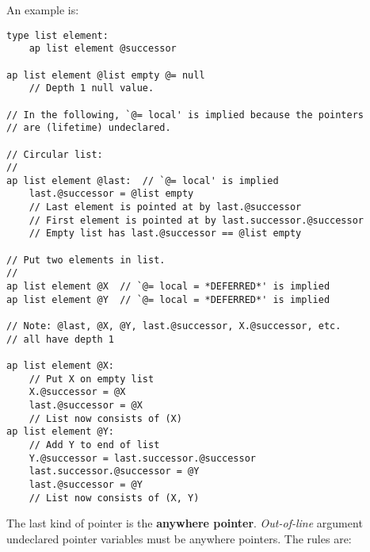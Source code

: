 \documentclass[12pt]{article}
\newcommand{\key}[1]{{\rm \bfseries #1}}
\newenvironment{indpar}[1][0.3in]%
	{\begin{list}{}%
		     {\setlength{\itemsep}{0in}%
		      \setlength{\topsep}{0in}%
		      \setlength{\parsep}{1ex}%
		      \setlength{\labelwidth}{#1}%
		      \setlength{\leftmargin}{#1}%
		      \addtolength{\leftmargin}{\labelsep}}%
	 \item}%
	{\end{list}}
\begin{document}
An example is:
\begin{indpar}\begin{verbatim}
type list element:
    ap list element @successor

ap list element @list empty @= null
    // Depth 1 null value.

// In the following, `@= local' is implied because the pointers
// are (lifetime) undeclared.

// Circular list:
//
ap list element @last:  // `@= local' is implied
    last.@successor = @list empty
    // Last element is pointed at by last.@successor
    // First element is pointed at by last.successor.@successor
    // Empty list has last.@successor == @list empty

// Put two elements in list.
//
ap list element @X  // `@= local = *DEFERRED*' is implied
ap list element @Y  // `@= local = *DEFERRED*' is implied

// Note: @last, @X, @Y, last.@successor, X.@successor, etc.
// all have depth 1

ap list element @X:
    // Put X on empty list
    X.@successor = @X
    last.@successor = @X
    // List now consists of (X)
ap list element @Y:
    // Add Y to end of list
    Y.@successor = last.successor.@successor
    last.successor.@successor = @Y
    last.@successor = @Y
    // List now consists of (X, Y)
\end{verbatim}\end{indpar}

The last kind of pointer is the \key{anywhere pointer}.
{\em Out-of-line} argument undeclared pointer variables
must be anywhere pointers.  The rules are:
\end{document}
